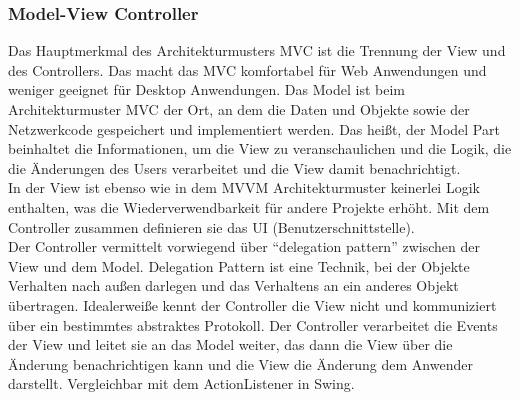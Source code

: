 \setcounter{secnumdepth}{3}
\subsubsection{Model-View Controller}
Das Hauptmerkmal des Architekturmusters \ac{MVC} ist die Trennung der View und des Controllers. Das macht das MVC komfortabel f\"ur Web Anwendungen und weniger geeignet f\"ur Desktop Anwendungen\cite{Syromiatnikov2014}.
Das Model ist beim Architekturmuster \ac{MVC} der Ort, an dem die Daten und Objekte sowie der Netzwerkcode gespeichert und implementiert werden. Das hei\ss{}t, der Model Part beinhaltet die Informationen, um die View zu veranschaulichen und die Logik, die die \"Anderungen des Users verarbeitet und die View damit benachrichtigt\cite{Leff2001}.\\
In der View ist ebenso wie in dem \ac{MVVM} Architekturmuster keinerlei Logik enthalten, was die Wiederverwendbarkeit f\"ur andere Projekte erh\"oht\cite{Peres2016}. Mit dem Controller zusammen definieren sie das \ac{UI} (Benutzerschnittstelle)\cite{Leff2001}.\\
Der Controller vermittelt vorwiegend \"uber \enquote{delegation pattern} zwischen der View und dem Model. Delegation Pattern ist eine Technik, bei der Objekte Verhalten nach au\ss{}en darlegen und das Verhaltens an ein anderes Objekt \"ubertragen\cite{TU-Wien2013}. Idealerwei\ss{}e kennt der Controller die View nicht und kommuniziert \"uber ein bestimmtes abstraktes Protokoll\cite{Peres2016}.
Der Controller verarbeitet die Events der View und leitet sie an das Model weiter, das dann die View \"uber die \"Anderung benachrichtigen kann und die View die \"Anderung dem Anwender darstellt. Vergleichbar mit dem ActionListener in Swing\cite{Singer2004}.
